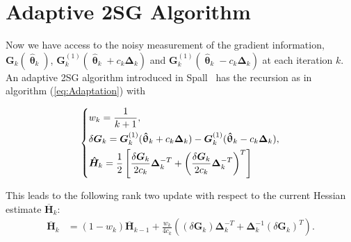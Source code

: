 \documentclass[conference]{IEEEtran}
\newcommand{\bG}{\bm{G}}
\newcommand{\bDelta}{\bm{\Delta}}
\newcommand{\oH}{\bm{\overline{H}}}
\newcommand{\hH}{\bm{\hat{H}}}
\newcommand{\htheta}{\bm{\hat{\uptheta}}}
\newcommand{\remove}[1]{}
\begin{document}
\section{Adaptive 2SG Algorithm} \label{2SG} Now we have
access to the noisy measurement of the gradient information,
$\bG_k(\htheta_k)$, $\bG_k^{(1)}(\htheta_k+ c_k\bDelta_k)$ and
$\bG_k^{(1)}(\htheta_k- c_k\bDelta_k)$ at each iteration $k$. An
adaptive 2SG algorithm introduced in Spall~\cite{Spall2000} has the
recursion as in algorithm (\ref{eq:Adaptation}) with

\begin{equation} \label{eq:notationSG}
  \begin{dcases}
    w_k=\frac{1}{k+1},\\
    \delta\bG_k=\bG_k^{(1)}(\htheta_k+ c_k\bDelta_k)-\bG_k^{(1)}(\htheta_k- c_k\bDelta_k),\\
    \hH_k=\frac{1}{2}\left[ \frac{\delta\bG_k}{2c_k}\bDelta_k^{-T}+\left(\frac{\delta\bG_k}{2c_k}\bDelta_k^{-T}\right)^T \right]\\
  \end{dcases}
\end{equation}

This leads to the following rank two update with respect to
the current Hessian estimate $\oH_k$:
\begin{align*}
\oH_k &= (1 - w_k) \oH_{k-1} + \frac{w_k}{4c_k} ((\delta\bG_k)\bDelta_k^{-T}+\bDelta_k^{-1}(\delta\bG_k)^{T}).
\end{align*} \remove{ Above gives a rank-two update from $
  \oH_{k-1}^{-1} $ to $ \oH_{k}^{-1} $. Write the sequential recursions
  for the $ \oH_k^{-1} $ as following:
  \begin{equation} \label{eq:2SGSequentialUpdate}
    \begin{dcases} \bm{B}_k^{-1}
      &=\frac{k+1}{k}\oH_{k-1}^{-1}-(\frac{k+1}{k})^2\oH_{k-1}^{-1}(\delta\bG_k)\\
      &~~~\cdot(b_k^{-1}+\frac{k+1}{k}\bDelta_k^{-T}\oH_{k-1}^{-1}(\delta\bG_k)\bDelta_k^{-T}\oH_{k-1}^{-1}\\
      \oH_k^{-1} &=\bm{B}_k^{-1}-\bm{B}_k^{-1}\bDelta_k^{-1}\\
      &~~~\cdot(b_k^{-1}+(\delta\bG_k)^{T}\bm{B}_k^{-1}\bDelta_k^{-1})^{-1}(\delta\bG_k)^{T}\bm{B}_k^{-1}
    \end{dcases}
  \end{equation} where
  \begin{equation}\label{eq:2SGB}
    \bm{B}_k=\frac{k}{k+1}\oH_{k-1}+b_k(\delta\bG_k)\bDelta_k^{-T}
  \end{equation}}
\end{document}
